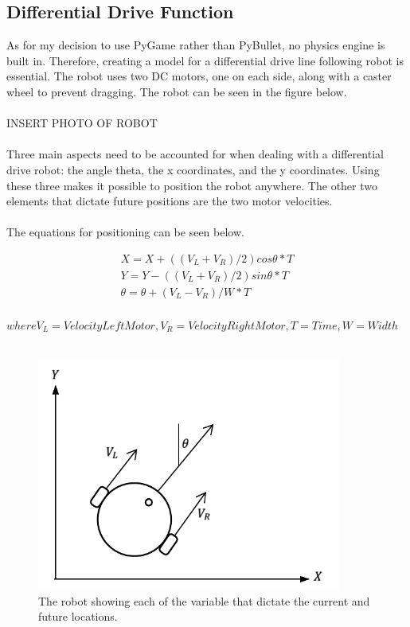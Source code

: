 \documentclass[12pt]{article}
\begin{document}
\subsection{Differential Drive Function}
As for my decision to use PyGame rather than PyBullet, no physics engine is built in. Therefore, creating a model for a differential drive line following robot is essential. The robot uses two DC motors, one on each side, along with a caster wheel to prevent dragging. The robot can be seen in the figure below.
\\\\
INSERT PHOTO OF ROBOT
\\\\
Three main aspects need to be accounted for when dealing with a differential drive robot: the angle theta, the x coordinates, and the y coordinates. Using these three makes it possible to position the robot anywhere. The other two elements that dictate future positions are the two motor velocities.
\\\\
The equations for positioning can be seen below.


\begin{equation}
\begin{aligned}
X = X+((V_L+V_R)/2) cos\theta*T \\
Y=Y-((V_L+V_R)/2) sin\theta*T \\
\theta=\theta+(V_L-V_R)/W*T
\end{aligned}
\end{equation}\\
$where V_L=Velocity Left Motor,V_R=Velocity Right Motor,T=Time,W=Width$ \\\\
\begin{figure}[H]
\label{fig:}
\centering
\includegraphics[width=10cm]{imgs/DiffGraph.png}
\centering

\caption{The robot showing each of the variable that dictate the current and future locations.}
\end{figure}
\end{document}
